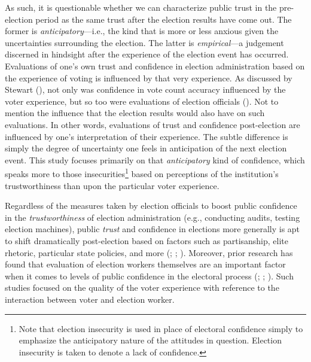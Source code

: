 \documentclass[
  12pt,
  letterpaper,
]{article}
\begin{document}
As such, it is questionable whether we can characterize public trust in
the pre-election period as the same trust after the election results
have come out. The former is \emph{anticipatory}---i.e., the kind that
is more or less anxious given the uncertainties surrounding the
election. The latter is \emph{empirical}---a judgement discerned in
hindsight after the experience of the election event has occurred.
Evaluations of one's own trust and confidence in election administration
based on the experience of voting is influenced by that very experience.
As discussed by Stewart (), not only was
confidence in vote count accuracy influenced by the voter experience,
but so too were evaluations of election officials
(). Not to mention the
influence that the election results would also have on such evaluations.
In other words, evaluations of trust and confidence post-election are
influenced by one's interpretation of their experience. The subtle
difference is simply the degree of uncertainty one feels in anticipation
of the next election event. This study focuses primarily on that
\emph{anticipatory} kind of confidence, which speaks more to those
insecurities\footnote{Note that election insecurity is used in place of
  electoral confidence simply to emphasize the anticipatory nature of
  the attitudes in question. Election insecurity is taken to denote a
  lack of confidence.} based on perceptions of the institution's
trustworthiness than upon the particular voter experience.

Regardless of the measures taken by election officials to boost public
confidence in the \emph{trustworthiness} of election administration
(e.g., conducting audits, testing election machines), public
\emph{trust} and confidence in elections more generally is apt to shift
dramatically post-election based on factors such as partisanship, elite
rhetoric, particular state policies, and more
(;
;
). Moreover, prior
research has found that evaluation of election workers themselves are an
important factor when it comes to levels of public confidence in the
electoral process (;
;
).
Such studies focused on the quality of the voter experience with
reference to the interaction between voter and election worker.
\end{document}
